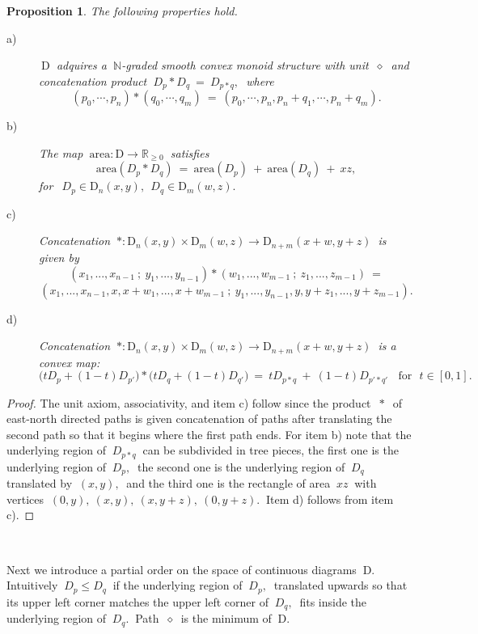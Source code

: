 \documentclass[10pt,leqeq]{article}
\newtheorem{prop}[thm]{Proposition} %
\begin{document}
\begin{prop}
{\em  The following properties hold. 
\begin{description}
  \item[a)] $\ \mathrm{D} \ $ adquires a $\ \mathbb{N}$-graded smooth convex monoid structure with unit $\ \diamond \ $ and concatenation product 
$ \  D_p \ast D_q \ = \ D_{p \ast q} , \  $ where
$$(p_0, \cdots, p_n)\ast (q_0, \cdots, q_m) \ = \
  (p_0, \cdots, p_n, p_n+q_1, \cdots, p_n+q_m).$$
  \item[b)] The map $\ \mathrm{area}: \mathrm{D} \longrightarrow \mathbb{R}_{\geq 0}\  $ satisfies
$$ \mathrm{area}(D_p \ast D_q ) \ = \  \mathrm{area}(D_p) \ + \ \mathrm{area}(D_q) \ + \ xz, $$ for $\ \ D_p \in \mathrm{D}_n(x,y), \ \ D_q \in \mathrm{D}_m(w,z)  .$
  \item[c)] Concatenation $ \ \ast: \mathrm{D}_n(x,y) \times \mathrm{D}_m(w,z) \longrightarrow 
\mathrm{D}_{n+m}(x+w,y+z) \ $ is given by
 $$(x_1,...,x_{n-1}\ ; \ y_1,...,y_{n-1})\ast (w_1,...,w_{m-1}\ ; \ z_1,...,z_{m-1}) \ = $$
 $$(x_1,...,x_{n-1},x,x+w_1,...,x+w_{m-1} \ ; \
 y_1,...,y_{n-1},y,y+z_1,...,y+z_{m-1}) .$$
 \item[d)] Concatenation $ \ \ast: \mathrm{D}_n(x,y) \times \mathrm{D}_m(w,z) \longrightarrow 
\mathrm{D}_{n+m}(x+w,y+z) \ $ is a convex map:
 $$\big(tD_p+(1-t)D_{p'}\big)\ast \big(tD_q+(1-t)D_{q'}\big) \ = \ tD_{p\ast q } \ + \ 
 (1-t)D_{p'\ast q'}\ \ \ \ \mbox{for} \ \ \ t\in [0,1].$$
\end{description}
}
\end{prop}



\begin{proof}
The unit axiom, associativity, and item c) follow since
the product $\ \ast \ $ of east-north directed paths is given concatenation of paths after translating the second path so that it begins where the first path ends. For item b) note that the underlying region of 
$ \ D_{p \ast q} \ $ can be subdivided in tree pieces, the first one is the underlying region of $ \ D_{p}, \ $ the second one is the underlying region of $ \ D_{q} \ $ translated by $\ (x,y), \ $  and the third one is the rectangle of area $\ xz \ $ with vertices 
$\ (0,y),  \ (x,y),  \ (x,y+z),  \ (0,y+z). \ $ Item d) follows from item c).
\end{proof}


\

Next we introduce a partial order on the space of continuous diagrams
$\  \mathrm{D}. \  $ Intuitively $\ D_p \leq D_q \ $ if the underlying region of
$\ D_p, \ $ translated upwards so that its upper left corner  
matches the upper left corner of $ \ D_q, \ $ fits inside the underlying region of $ \ D_q. \ $  Path $\ \diamond \ $ is the minimum of $\  \mathrm{D}. \  $
\end{document}
